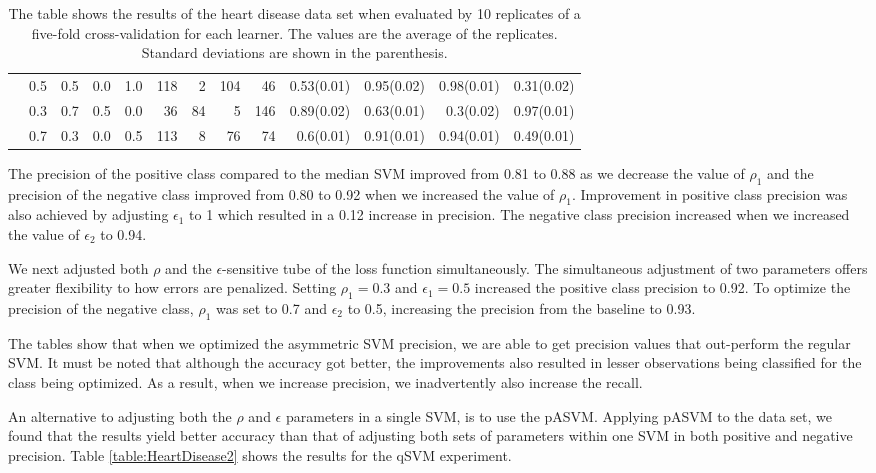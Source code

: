 \documentclass[twoside,11pt]{article}
\begin{document}
\begin{table}[htp]
\begin{tabular}{rrrrr|rrrrrrrr}
      & 0.5   & 0.5   & 0.0   & 1.0   & 118   & 2     & 104   & 46    & 0.53(0.01) & 0.95(0.02) & 0.98(0.01) & 0.31(0.02) \\
      & 0.3   & 0.7   & 0.5   & 0.0   & 36    & 84    & 5     & 146   & 0.89(0.02) & 0.63(0.01) & 0.3(0.02) & 0.97(0.01) \\
      & 0.7   & 0.3   & 0.0   & 0.5   & 113   & 8     & 76    & 74    & 0.6(0.01) & 0.91(0.01) & 0.94(0.01) & 0.49(0.01) \bigstrut[b]\\
\hline
\hline
    \end{tabular}%
  \caption{The table shows the results of the heart disease data set when evaluated by 10 replicates of a five-fold cross-validation for each learner. The values are the average of the replicates. Standard deviations are shown in the parenthesis.
  }
\end{table}\label{table:HeartDisease1}

The precision of the positive class compared to the median SVM improved from 0.81 to 0.88 as we decrease the value of $\rho_1$ and the precision of the negative class improved from 0.80 to 0.92 when we increased the value of $\rho_1$. Improvement in positive class precision was also achieved by adjusting $\epsilon_1$ to 1 which resulted in a 0.12 increase in precision. The negative class precision increased when we increased the value of $\epsilon_2$ to 0.94. 


We next adjusted both $\rho$ and the $\epsilon$-sensitive tube of the loss function simultaneously. The simultaneous adjustment of two parameters offers greater flexibility to how errors are penalized. Setting $\rho_1=0.3$ and $\epsilon_1=0.5$ increased the positive class precision to 0.92. To optimize the precision of the negative class, $\rho_1$ was set to 0.7 and $\epsilon_2$ to 0.5, increasing the precision from the baseline to 0.93. 

The tables show that when we optimized the asymmetric SVM precision, we are able to get precision values that out-perform the regular SVM. It must be noted that although the accuracy got better, the improvements also resulted in lesser observations being classified for the class being optimized. As a result, when we increase precision, we inadvertently also increase the recall. 

An alternative to adjusting both the $\rho$ and $\epsilon$ parameters in a single SVM, is to use the pASVM. Applying pASVM to the data set, we found that the results yield better accuracy than that of adjusting both sets of parameters within one SVM in both positive and negative precision. Table \ref{table:HeartDisease2} shows the results for the qSVM experiment. 
\end{document}
